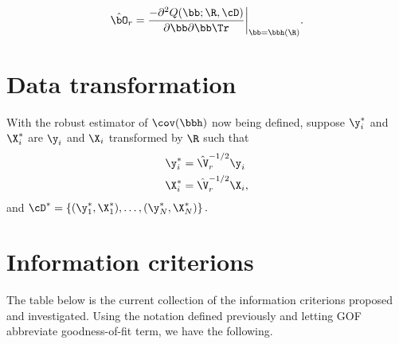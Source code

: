 \documentclass{article}
\begin{document}
\begin{equation*}
  \hat{\bO}_{r} = \frac{-\partial^{2}Q(\bb; \R, \cD)}{\partial\bb\partial\bb\Tr}\bigg|_{\bb = \bbh(\R)}.
\end{equation*}

\section*{Data transformation}
With the robust estimator of $\cov(\bbh)$ now being defined, suppose $\y_{i}^{*}$ and $\X_{i}^{*}$ are $\y_{i}$ and $\X_{i}$ transformed by $\R$ such that
\begin{align*}
  \y_{i}^{*} &= \hat{\V}_{r}^{-1/2}\y_{i} \\
  \X_{i}^{*} &= \hat{\V}_{r}^{-1/2}\X_{i},
\end{align*}
and $\cD^{*} = \left\{(\y_{1}^{*}, \X_{1}^{*}), \ldots, (\y_{N}^{*}, \X_{N}^{*})\right\}.$

\pagebreak

\section*{Information criterions}
The table below is the current collection of the information criterions proposed and investigated. Using the notation defined previously and letting GOF abbreviate goodness-of-fit term, we have the following.
\end{document}
